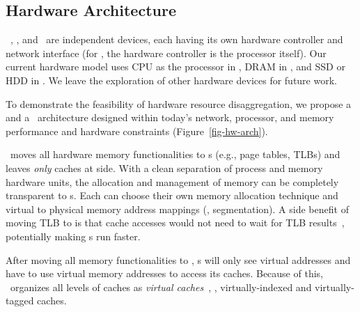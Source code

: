 \documentclass[10pt,times,twocolumn]{z2-article}
\begin{document}
{{{{{{{
\subsection{Hardware Architecture}
\label{sec:hardware}
\lego\ \pcomponent, \mcomponent, and \scomponent\ are independent devices,
each having its own hardware controller and network interface (for \pcomponent, the hardware controller is the processor itself).
Our current hardware model uses CPU as the processor in \pcomponent, 
DRAM in \mcomponent, and SSD or HDD in \scomponent.
We leave the exploration of other hardware devices for future work.

To demonstrate the feasibility of hardware resource disaggregation,
we propose a \pcomponent{} and a \mcomponent\ architecture designed 
within today's network, processor, and memory performance and hardware constraints
(Figure~\ref{fig-hw-arch}).

\lego\ moves all hardware memory functionalities to \mcomponent{}s 
(e.g., page tables, TLBs) and leaves {\em only} caches at \pcomponent{} side. 
With a clean separation of process and memory hardware units, 
the allocation and management of memory can be completely transparent to \pcomponent{}s.
Each \mcomponent{} can choose their own memory allocation technique
and virtual to physical memory address mappings (\eg, segmentation). 
A side benefit of moving TLB to \mcomponent{} is that \pcomponent{} cache accesses would not 
need to wait for TLB results~\cite{Kaxiras-ISCA13}, potentially making \pcomponent{}s run faster.

After moving all memory functionalities to \mcomponent, %
\pcomponent{}s will only see virtual addresses and have to use virtual memory addresses to access its caches. 
Because of this, \lego\ organizes all levels of \pcomponent{} caches as {\em virtual caches}~\cite{Goodman-ASPLOS87,Wang-ISCA89},
\ie, virtually-indexed and virtually-tagged caches.

}}}}}}}
\end{document}

